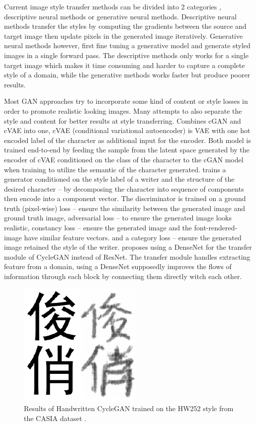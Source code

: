 \documentclass[12pt]{report}
\begin{document}
Current image style transfer methods can be divided into 2 categories \cite{neural-style}, descriptive neural methods or generative neural methods. Descriptive neural methods transfer the styles by computing the gradients between the source and target image then update pixels in the generated image iteratively. Generative neural methods however, first fine tuning a generative model and generate styled images in a single forward pass. The descriptive methods only works for a single target image which makes it time consuming and harder to capture a complete style of a domain, while the generative methods works faster but produce poorer results.

Most GAN\cite{gan} approaches try to incorporate some kind of content or style losses in order to promote realistic looking images. Many attempts to also separate the style and content for better results at style transferring.
\cite{handwritten-cgan} Combines cGAN \cite{cgan} and cVAE \cite{cvae} into one, cVAE (conditional variational autoencoder) is VAE with one hot encoded label of the character as additional input for the encoder. Both model is trained end-to-end by feeding the sample from the latent space generated by the encoder of cVAE conditioned on the class of the character to the cGAN model when training to utilize the semantic of the character generated.
\cite{calligan} trains a generator conditioned on the style label of a writer and the structure of the desired character – by decomposing the character into sequence of components then encode into a component vector. The discriminator is trained on a ground truth (pixel-wise) loss – ensure the similarity between the generated image and ground truth image, adversarial loss – to ensure the generated image looks realistic, constancy loss – ensure the generated image and the font-rendered-image have similar feature vectors. and a category loss – ensure the generated image retained the style of the writer.
\cite{handwritten-cyclegan} proposes using a DenseNet for the transfer module of CycleGAN instead of ResNet. The transfer module handles extracting feature from a domain, using a DenseNet supposedly improves the flows of information through each block by connecting them directly witch each other.

\begin{figure}[h]
	\centering
	\includegraphics[scale=0.9]{handwritten-cycle-gan-result}
	\caption{Results of Handwritten CycleGAN \cite{handwritten-cyclegan} trained on the HW252 style from the CASIA dataset \cite{casia}.}
	\label{fig:handwritten-cycle-gan-result}
\end{figure}
\end{document}
